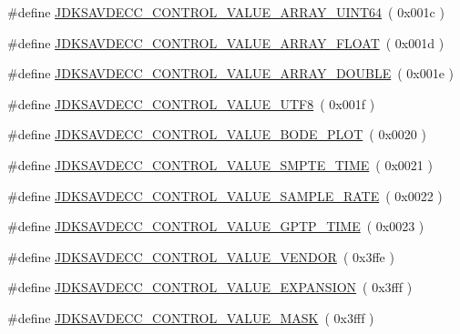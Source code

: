 \begin{DoxyCompactItemize}
\item 
\#define \hyperlink{group__aem__control__value_gaa9bd93ad504cb19fbd64c058e6eaa962}{J\+D\+K\+S\+A\+V\+D\+E\+C\+C\+\_\+\+C\+O\+N\+T\+R\+O\+L\+\_\+\+V\+A\+L\+U\+E\+\_\+\+A\+R\+R\+A\+Y\+\_\+\+U\+I\+N\+T64}~( 0x001c )
\item 
\#define \hyperlink{group__aem__control__value_ga770bfbbaa4e870e9825c8916f4472814}{J\+D\+K\+S\+A\+V\+D\+E\+C\+C\+\_\+\+C\+O\+N\+T\+R\+O\+L\+\_\+\+V\+A\+L\+U\+E\+\_\+\+A\+R\+R\+A\+Y\+\_\+\+F\+L\+O\+AT}~( 0x001d )
\item 
\#define \hyperlink{group__aem__control__value_ga164b26c8577f9f037ece3877d7c8a07e}{J\+D\+K\+S\+A\+V\+D\+E\+C\+C\+\_\+\+C\+O\+N\+T\+R\+O\+L\+\_\+\+V\+A\+L\+U\+E\+\_\+\+A\+R\+R\+A\+Y\+\_\+\+D\+O\+U\+B\+LE}~( 0x001e )
\item 
\#define \hyperlink{group__aem__control__value_ga42ad0a13c28e2da03c3b8a1dbe523eeb}{J\+D\+K\+S\+A\+V\+D\+E\+C\+C\+\_\+\+C\+O\+N\+T\+R\+O\+L\+\_\+\+V\+A\+L\+U\+E\+\_\+\+U\+T\+F8}~( 0x001f )
\item 
\#define \hyperlink{group__aem__control__value_ga41f3376a5ea5d38faa4879ec40186926}{J\+D\+K\+S\+A\+V\+D\+E\+C\+C\+\_\+\+C\+O\+N\+T\+R\+O\+L\+\_\+\+V\+A\+L\+U\+E\+\_\+\+B\+O\+D\+E\+\_\+\+P\+L\+OT}~( 0x0020 )
\item 
\#define \hyperlink{group__aem__control__value_ga448974709149a6ec59bb0008fb566e01}{J\+D\+K\+S\+A\+V\+D\+E\+C\+C\+\_\+\+C\+O\+N\+T\+R\+O\+L\+\_\+\+V\+A\+L\+U\+E\+\_\+\+S\+M\+P\+T\+E\+\_\+\+T\+I\+ME}~( 0x0021 )
\item 
\#define \hyperlink{group__aem__control__value_ga7cdd16849237ef4191e625276a1a377d}{J\+D\+K\+S\+A\+V\+D\+E\+C\+C\+\_\+\+C\+O\+N\+T\+R\+O\+L\+\_\+\+V\+A\+L\+U\+E\+\_\+\+S\+A\+M\+P\+L\+E\+\_\+\+R\+A\+TE}~( 0x0022 )
\item 
\#define \hyperlink{group__aem__control__value_gaa1f949c4595b08e4e63d40e8a62eff39}{J\+D\+K\+S\+A\+V\+D\+E\+C\+C\+\_\+\+C\+O\+N\+T\+R\+O\+L\+\_\+\+V\+A\+L\+U\+E\+\_\+\+G\+P\+T\+P\+\_\+\+T\+I\+ME}~( 0x0023 )
\item 
\#define \hyperlink{group__aem__control__value_ga0fd74363ed131dd080e0fcc73c8384f5}{J\+D\+K\+S\+A\+V\+D\+E\+C\+C\+\_\+\+C\+O\+N\+T\+R\+O\+L\+\_\+\+V\+A\+L\+U\+E\+\_\+\+V\+E\+N\+D\+OR}~( 0x3ffe )
\item 
\#define \hyperlink{group__aem__control__value_gad96015c58d9f21fb5a8af0053ab92675}{J\+D\+K\+S\+A\+V\+D\+E\+C\+C\+\_\+\+C\+O\+N\+T\+R\+O\+L\+\_\+\+V\+A\+L\+U\+E\+\_\+\+E\+X\+P\+A\+N\+S\+I\+ON}~( 0x3fff )
\item 
\#define \hyperlink{group__aem__control__value_ga66c8319cd1dc8fb3f753c477d1ce4837}{J\+D\+K\+S\+A\+V\+D\+E\+C\+C\+\_\+\+C\+O\+N\+T\+R\+O\+L\+\_\+\+V\+A\+L\+U\+E\+\_\+\+M\+A\+SK}~( 0x3fff )

\end{DoxyCompactItemize}

